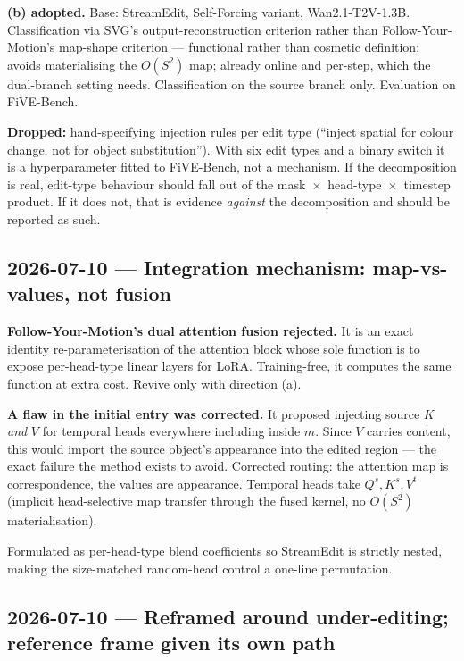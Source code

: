 \documentclass{article}
\begin{document}
\textbf{(b) adopted.} Base: StreamEdit, Self-Forcing variant, Wan2.1-T2V-1.3B.
Classification via SVG's output-reconstruction criterion rather than
Follow-Your-Motion's map-shape criterion --- functional rather than cosmetic
definition; avoids materialising the $O(S^2)$ map; already online and per-step,
which the dual-branch setting needs. Classification on the source branch only.
Evaluation on FiVE-Bench.

\textbf{Dropped:} hand-specifying injection rules per edit type (``inject spatial
for colour change, not for object substitution''). With six edit types and a
binary switch it is a hyperparameter fitted to FiVE-Bench, not a mechanism. If
the decomposition is real, edit-type behaviour should fall out of the
mask~$\times$~head-type~$\times$~timestep product. If it does not, that is
evidence \emph{against} the decomposition and should be reported as such.

\subsection*{2026-07-10 --- Integration mechanism: map-vs-values, not fusion}

\textbf{Follow-Your-Motion's dual attention fusion rejected.} It is an exact
identity re-parameterisation of the attention block whose sole function is to
expose per-head-type linear layers for LoRA. Training-free, it computes the same
function at extra cost. Revive only with direction (a).

\textbf{A flaw in the initial entry was corrected.} It proposed injecting source
$K$ \emph{and} $V$ for temporal heads everywhere including inside $m$. Since $V$
carries content, this would import the source object's appearance into the edited
region --- the exact failure the method exists to avoid. Corrected routing:
the attention map is correspondence, the values are appearance. Temporal heads
take $Q^{s},K^{s},V^{t}$ (implicit head-selective map transfer through the fused
kernel, no $O(S^2)$ materialisation).

Formulated as per-head-type blend coefficients so StreamEdit is strictly nested,
making the size-matched random-head control a one-line permutation.

\subsection*{2026-07-10 --- Reframed around under-editing; reference frame given its own path}
\end{document}
